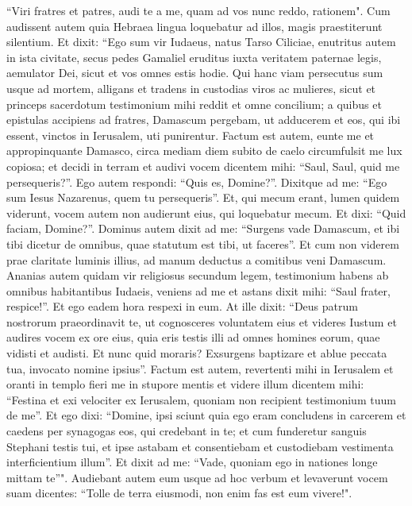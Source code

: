 \begin{biblechapter}  
\verse “Viri fratres et patres, audi te a me, quam ad vos nunc reddo, rationem". 
\verse Cum audissent autem quia Hebraea lingua loquebatur ad illos, magis praestiterunt silentium. Et dixit: 
\verse “Ego sum vir Iudaeus, natus Tarso Ciliciae, enutritus autem in ista civitate, secus pedes Gamaliel eruditus iuxta veritatem paternae legis, aemulator Dei, sicut et vos omnes estis hodie. 
\verse Qui hanc viam persecutus sum usque ad mortem, alligans et tradens in custodias viros ac mulieres, 
\verse sicut et princeps sacerdotum testimonium mihi reddit et omne concilium; a quibus et epistulas accipiens ad fratres, Damascum pergebam, ut adducerem et eos, qui ibi essent, vinctos in Ierusalem, uti punirentur. 
\verse Factum est autem, eunte me et appropinquante Damasco, circa mediam diem subito de caelo circumfulsit me lux copiosa; 
\verse et decidi in terram et audivi vocem dicentem mihi: “Saul, Saul, quid me persequeris?”. 
\verse Ego autem respondi: “Quis es, Domine?”. Dixitque ad me: “Ego sum Iesus Nazarenus, quem tu persequeris”. 
\verse Et, qui mecum erant, lumen quidem viderunt, vocem autem non audierunt eius, qui loquebatur mecum. 
\verse Et dixi: “Quid faciam, Domine?”. Dominus autem dixit ad me: “Surgens vade Damascum, et ibi tibi dicetur de omnibus, quae statutum est tibi, ut faceres”. 
\verse Et cum non viderem prae claritate luminis illius, ad manum deductus a comitibus veni Damascum. 
\verse Ananias autem quidam vir religiosus secundum legem, testimonium habens ab omnibus habitantibus Iudaeis, 
\verse veniens ad me et astans dixit mihi: “Saul frater, respice!”. Et ego eadem hora respexi in eum. 
\verse At ille dixit: “Deus patrum nostrorum praeordinavit te, ut cognosceres voluntatem eius et videres Iustum et audires vocem ex ore eius, 
\verse quia eris testis illi ad omnes homines eorum, quae vidisti et audisti. 
\verse Et nunc quid moraris? Exsurgens baptizare et ablue peccata tua, invocato nomine ipsius”. 
\verse Factum est autem, revertenti mihi in Ierusalem et oranti in templo fieri me in stupore mentis 
\verse et videre illum dicentem mihi: “Festina et exi velociter ex Ierusalem, quoniam non recipient testimonium tuum de me”. 
\verse Et ego dixi: “Domine, ipsi sciunt quia ego eram concludens in carcerem et caedens per synagogas eos, qui credebant in te; 
\verse et cum funderetur sanguis Stephani testis tui, et ipse astabam et consentiebam et custodiebam vestimenta interficientium illum”. 
\verse Et dixit ad me: “Vade, quoniam ego in nationes longe mittam te”". 
\verse Audiebant autem eum usque ad hoc verbum et levaverunt vocem suam dicentes: “Tolle de terra eiusmodi, non enim fas est eum vivere!". 

\end{biblechapter}
